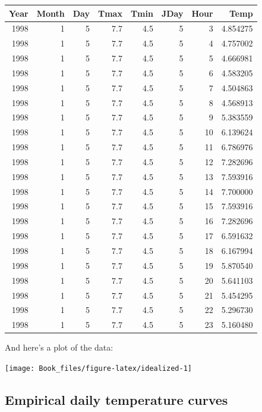\documentclass[
]{book}
\begin{document}
\begin{tabular}{r|r|r|r|r|r|r|r}
\hline
Year & Month & Day & Tmax & Tmin & JDay & Hour & Temp\\
\hline
1998 & 1 & 5 & 7.7 & 4.5 & 5 & 3 & 4.854275\\
\hline
1998 & 1 & 5 & 7.7 & 4.5 & 5 & 4 & 4.757002\\
\hline
1998 & 1 & 5 & 7.7 & 4.5 & 5 & 5 & 4.666981\\
\hline
1998 & 1 & 5 & 7.7 & 4.5 & 5 & 6 & 4.583205\\
\hline
1998 & 1 & 5 & 7.7 & 4.5 & 5 & 7 & 4.504863\\
\hline
1998 & 1 & 5 & 7.7 & 4.5 & 5 & 8 & 4.568913\\
\hline
1998 & 1 & 5 & 7.7 & 4.5 & 5 & 9 & 5.383559\\
\hline
1998 & 1 & 5 & 7.7 & 4.5 & 5 & 10 & 6.139624\\
\hline
1998 & 1 & 5 & 7.7 & 4.5 & 5 & 11 & 6.786976\\
\hline
1998 & 1 & 5 & 7.7 & 4.5 & 5 & 12 & 7.282696\\
\hline
1998 & 1 & 5 & 7.7 & 4.5 & 5 & 13 & 7.593916\\
\hline
1998 & 1 & 5 & 7.7 & 4.5 & 5 & 14 & 7.700000\\
\hline
1998 & 1 & 5 & 7.7 & 4.5 & 5 & 15 & 7.593916\\
\hline
1998 & 1 & 5 & 7.7 & 4.5 & 5 & 16 & 7.282696\\
\hline
1998 & 1 & 5 & 7.7 & 4.5 & 5 & 17 & 6.591632\\
\hline
1998 & 1 & 5 & 7.7 & 4.5 & 5 & 18 & 6.167994\\
\hline
1998 & 1 & 5 & 7.7 & 4.5 & 5 & 19 & 5.870540\\
\hline
1998 & 1 & 5 & 7.7 & 4.5 & 5 & 20 & 5.641103\\
\hline
1998 & 1 & 5 & 7.7 & 4.5 & 5 & 21 & 5.454295\\
\hline
1998 & 1 & 5 & 7.7 & 4.5 & 5 & 22 & 5.296730\\
\hline
1998 & 1 & 5 & 7.7 & 4.5 & 5 & 23 & 5.160480\\
\hline
\end{tabular}
\endgroup{}

And here's a plot of the data:

\texttt{[image: Book\_files/figure-latex/idealized-1]}

\hypertarget{empirical-daily-temperature-curves}{%
\subsection{Empirical daily temperature curves}\label{empirical-daily-temperature-curves}}
\end{document}
